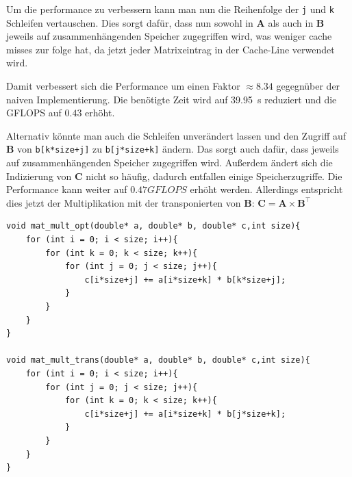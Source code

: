 \documentclass[a4paper,11pt]{scrartcl}
\begin{document}
Um die performance zu verbessern kann man nun die Reihenfolge der \verb+j+ und \verb+k+ Schleifen vertauschen. Dies sorgt dafür, dass nun sowohl in $\mathbf{A}$ als auch in $\mathbf{B}$ jeweils auf zusammenhängenden Speicher zugegriffen wird, was weniger cache misses zur folge hat, da jetzt jeder Matrixeintrag in der Cache-Line verwendet wird.

Damit verbessert sich die Performance um einen Faktor $\approx 8.34$ gegegnüber der naiven Implementierung. Die benötigte Zeit wird auf \SI{39.95}{\second} reduziert und die GFLOPS auf $0.43$ erhöht. 

Alternativ könnte man auch die Schleifen unverändert lassen und den Zugriff auf $\mathbf{B}$ von \verb|b[k*size+j]| zu \verb|b[j*size+k]| ändern. Das sorgt auch dafür, dass jeweils auf zusammenhängenden Speicher zugegriffen wird. Außerdem ändert sich die Indizierung von $\mathbf{C}$ nicht so häufig, dadurch entfallen einige Speicherzugriffe.
Die Performance kann weiter auf $0.47 GFLOPS$ erhöht werden. Allerdings entspricht dies jetzt der Multiplikation mit der transponierten von $\mathbf{B}$: $\mathbf{C}=\mathbf{A}\times \mathbf{B}^\intercal$

\begin{verbatim}
void mat_mult_opt(double* a, double* b, double* c,int size){
    for (int i = 0; i < size; i++){
        for (int k = 0; k < size; k++){
            for (int j = 0; j < size; j++){
                c[i*size+j] += a[i*size+k] * b[k*size+j];
            }
        }
    }
}

void mat_mult_trans(double* a, double* b, double* c,int size){
    for (int i = 0; i < size; i++){
        for (int j = 0; j < size; j++){
            for (int k = 0; k < size; k++){
                c[i*size+j] += a[i*size+k] * b[j*size+k];
            }
        }
    }
}
\end{verbatim}
\end{document}
